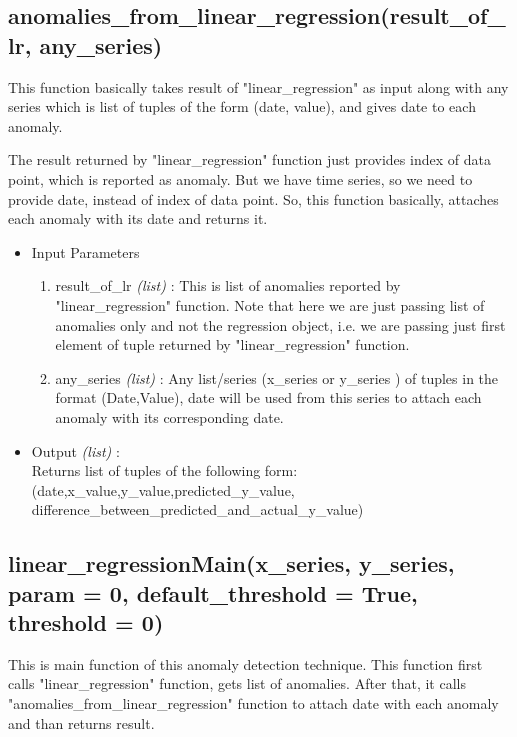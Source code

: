 \subsection{anomalies\_from\_linear\_regression(result\_of\_lr, any\_series)}

This function basically takes result of "linear\_regression" as input along with 
any series which is list of tuples of the form (date, value), and gives date to 
each anomaly. 

The result returned by "linear\_regression" function just provides index of data 
point, which is reported as anomaly. But we have time series, so we need to 
provide date, instead of index of data point. So, this function basically, 
attaches each anomaly with its date and returns it.

\begin{itemize}
 \item Input Parameters
 
 \begin{enumerate}
  \item result\_of\_lr \textit{(list)} : This is list of anomalies reported by 
"linear\_regression" function. Note that here we are just passing list of 
anomalies only and not the regression object, i.e. we are passing just first 
element of tuple returned by "linear\_regression" function.
  \item any\_series \textit{(list)} : Any list/series (x\_series or y\_series ) 
of tuples in the format (Date,Value), date will be used from this series to 
attach each anomaly with its corresponding date.
 \end{enumerate}

 \item Output \textit{(list)} : \\
 	Returns list of tuples of the following form: \\ 
 	
(date,x\_value,y\_value,predicted\_y\_value,
difference\_between\_predicted\_and\_actual\_y\_value)

\end{itemize}

\subsection{linear\_regressionMain(x\_series, y\_series, param = 0, 
default\_threshold = True, threshold = 0)}

This is main function of this anomaly detection technique. This function first 
calls "linear\_regression" function, gets list of anomalies. After that, it 
calls "anomalies\_from\_linear\_regression" function to attach date with each 
anomaly and than returns result.

